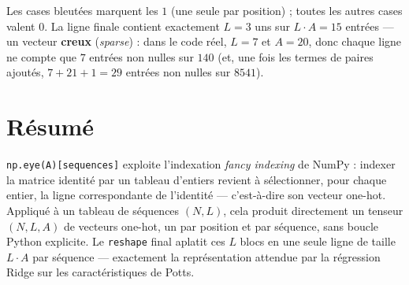 \documentclass[11pt,a4paper]{article}
\begin{document}
Les cases bleutées marquent les $1$ (une seule par position) ; toutes les
autres cases valent $0$. La ligne finale contient exactement $L=3$ uns sur
$L\cdot A = 15$ entrées --- un vecteur \textbf{creux} (\emph{sparse}) : dans le
code réel, $L=7$ et $A=20$, donc chaque ligne ne compte que $7$ entrées non
nulles sur $140$ (et, une fois les termes de paires ajoutés, $7+21+1=29$ entrées
non nulles sur $8541$).

\section{Résumé}

\begin{mdframed}
\texttt{np.eye(A)[sequences]} exploite l'indexation \emph{fancy indexing} de
NumPy : indexer la matrice identité par un tableau d'entiers revient à
sélectionner, pour chaque entier, la ligne correspondante de l'identité ---
c'est-à-dire son vecteur one-hot. Appliqué à un tableau de séquences $(N, L)$,
cela produit directement un tenseur $(N, L, A)$ de vecteurs one-hot, un par
position et par séquence, sans boucle Python explicite. Le \texttt{reshape}
final aplatit ces $L$ blocs en une seule ligne de taille $L\cdot A$ par
séquence --- exactement la représentation attendue par la régression Ridge
sur les caractéristiques de Potts.
\end{mdframed}
\end{document}
